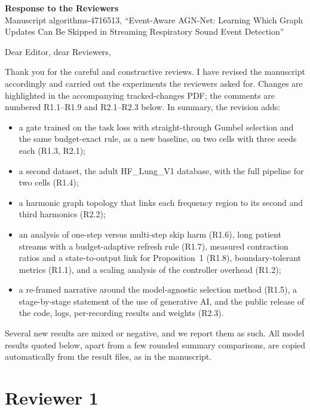\documentclass[11pt]{article}
\begin{document}
\begin{center}
{\large\textbf{Response to the Reviewers}}\\[3pt]
Manuscript algorithms-4716513, ``Event-Aware AGN-Net: Learning Which Graph Updates Can Be Skipped in Streaming Respiratory Sound Event Detection''
\end{center}

Dear Editor, dear Reviewers,

Thank you for the careful and constructive reviews. I have revised the manuscript accordingly and carried out the experiments the reviewers asked for. Changes are highlighted in the accompanying tracked-changes PDF; the comments are numbered R1.1--R1.9 and R2.1--R2.3 below. In summary, the revision adds:
\begin{itemize}[leftmargin=1.3em,itemsep=1pt]
\item a gate trained on the task loss with straight-through Gumbel selection and the same budget-exact rule, as a new baseline, on two cells with three seeds each (R1.3, R2.1);
\item a second dataset, the adult HF\_Lung\_V1 database, with the full pipeline for two cells (R1.4);
\item a harmonic graph topology that links each frequency region to its second and third harmonics (R2.2);
\item an analysis of one-step versus multi-step skip harm (R1.6), long patient streams with a budget-adaptive refresh rule (R1.7), measured contraction ratios and a state-to-output link for Proposition~1 (R1.8), boundary-tolerant metrics (R1.1), and a scaling analysis of the controller overhead (R1.2);
\item a re-framed narrative around the model-agnostic selection method (R1.5), a stage-by-stage statement of the use of generative AI, and the public release of the code, logs, per-recording results and weights (R2.3).
\end{itemize}
Several new results are mixed or negative, and we report them as such. All model results quoted below, apart from a few rounded summary comparisons, are copied automatically from the result files, as in the manuscript.

\section*{Reviewer 1}
\end{document}
